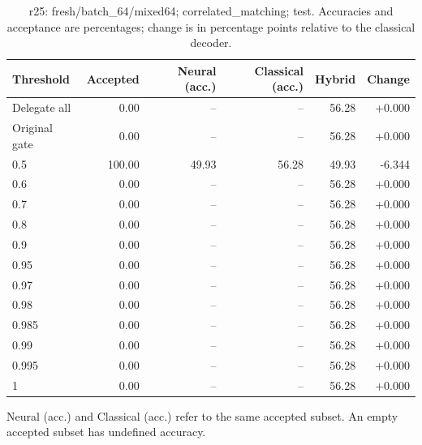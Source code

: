 \begin{table}[htbp]
\centering\small
\setlength{\tabcolsep}{3pt}
\caption{r25: fresh/batch\_64/mixed64; correlated\_matching; test. Accuracies and acceptance are percentages; change is in percentage points relative to the classical decoder.}
\begin{tabular}{lrrrrr}
\toprule
Threshold & Accepted & Neural (acc.) & Classical (acc.) & Hybrid & Change \\
\midrule
Delegate all & 0.00 & -- & -- & 56.28 & +0.000 \\
Original gate & 0.00 & -- & -- & 56.28 & +0.000 \\
0.5 & 100.00 & 49.93 & 56.28 & 49.93 & -6.344 \\
0.6 & 0.00 & -- & -- & 56.28 & +0.000 \\
0.7 & 0.00 & -- & -- & 56.28 & +0.000 \\
0.8 & 0.00 & -- & -- & 56.28 & +0.000 \\
0.9 & 0.00 & -- & -- & 56.28 & +0.000 \\
0.95 & 0.00 & -- & -- & 56.28 & +0.000 \\
0.97 & 0.00 & -- & -- & 56.28 & +0.000 \\
0.98 & 0.00 & -- & -- & 56.28 & +0.000 \\
0.985 & 0.00 & -- & -- & 56.28 & +0.000 \\
0.99 & 0.00 & -- & -- & 56.28 & +0.000 \\
0.995 & 0.00 & -- & -- & 56.28 & +0.000 \\
1 & 0.00 & -- & -- & 56.28 & +0.000 \\
\bottomrule
\end{tabular}
\par\smallskip\footnotesize Neural (acc.) and Classical (acc.) refer to the same accepted subset. An empty accepted subset has undefined accuracy.
\end{table}
